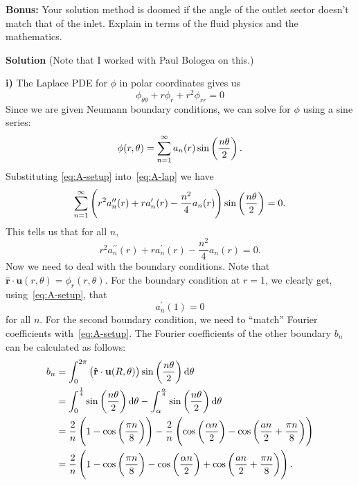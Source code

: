 \documentclass{article}
\def\*#1{\mathbf{#1}}
\newcommand{\rhat}{\mathbf{\hat{r}}}
\begin{document}
\textbf{Bonus:} Your solution method is doomed if the angle of the
outlet sector doesn't match that of the inlet. Explain in terms of the
fluid physics and the mathematics.

\newpage

\textbf{Solution} (Note that I worked with Paul Bologea on this.)

\textbf{i)} The Laplace PDE for $\phi$ in polar coordinates gives us
%
\begin{equation}
    \phi_{\theta \theta} + r \phi_r +  r^2 \phi_{r r} = 0
    \label{eq:A-lap}
\end{equation}
%
Since we are given Neumann boundary conditions, we can solve for $\phi$
using a sine series:
%
\begin{equation}
    \phi(r, \theta) = \sum_{n = 1}^\infty a_n(r) \sin \del{\frac{n \theta}{2}}
    \label{eq:A-setup}
    .
\end{equation}
%
Substituting \eqref{eq:A-setup} into~\eqref{eq:A-lap} we have
%
\begin{equation*}
    \sum_{n = 1}^\infty \del{
        r^2 a_n^{\prime \prime}(r) + r a_n^\prime(r) - \frac{n^2}{4} a_n(r)
    } \sin \del{\frac{n \theta}{2}}
    = 0
    .
\end{equation*}
%
This tells us that for all $n$,
%
\begin{equation}
    r^2 a_n^{\prime \prime}(r) + r a_n^\prime(r) - \frac{n^2}{4} a_n(r) = 0
    \label{eq:A-an}
    .
\end{equation}
%
Now we need to deal with the boundary conditions. Note that $\rhat \cdot
\*u(r, \theta) = \phi_r(r, \theta)$. For the boundary condition at $r =
1$, we clearly get, using~\eqref{eq:A-setup}, that
%
\begin{equation}
    a_n^\prime(1) = 0
    \label{eq:A-bc1}
\end{equation}
%
for all $n$. For the second boundary condition, we need to ``match''
Fourier coefficients with~\eqref{eq:A-setup}. The Fourier coefficients
of the other boundary $b_n$ can be calculated as follows:
%
\begin{align*}
    b_n
        &= \int_0^{2 \pi} \del{\rhat \cdot \*u(R, \theta)} \sin \del{\frac{n \theta}{2}} \dif \theta \\
        &=
            \int_0^{\frac{1}{4}} \sin \del{\frac{n \theta}{2}} \dif \theta
            -
            \int_\alpha^{\frac{\alpha}{4}} \sin \del{\frac{n \theta}{2}} \dif \theta \\
        &=
            \frac{2}{n} \del{1 - \cos \del{\frac{\pi n}{8}}}
            -
            \frac{2}{n} \del{\cos \del{\frac{\alpha n}{2}} - \cos \del{\frac{a n}{2} + \frac{\pi n}{8}}} \\
        &=
            \frac{2}{n} \del{
                1
                - \cos \del{\frac{\pi n}{8}}
                -
                \cos \del{\frac{\alpha n}{2}}
                + \cos \del{\frac{a n}{2} + \frac{\pi n}{8}}
            }
            .
\end{align*}
\end{document}
